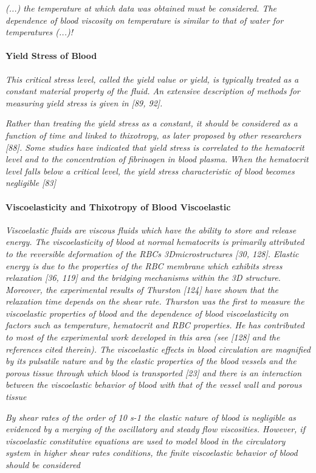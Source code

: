 \documentclass[11pt,letterpaper]{article}
\begin{document}
\textit{(...) the temperature at which
data was obtained must be considered. The dependence of blood viscosity on temperature is similar to that of water for temperatures (...)!}


\paragraph{Yield Stress of Blood}
\textit{
This critical stress level, called the yield value or
yield, is typically treated as a constant material property of the fluid. An extensive
description of methods for measuring yield stress is given in [89, 92].}

\textit{Rather than treating the yield stress as a constant, it should be considered as a function of time and linked to thixotropy, as later proposed by other researchers [88]. Some studies have indicated that yield stress is correlated to the hematocrit level and to the concentration of fibrinogen in blood plasma. When the hematocrit level falls below a critical level, the yield stress characteristic of blood becomes negligible [83]}


\paragraph{Viscoelasticity and Thixotropy of Blood
Viscoelastic}
\textit{Viscoelastic fluids are viscous fluids which have the ability to store and release energy. The viscoelasticity of blood at normal hematocrits is primarily attributed to the reversible deformation of the RBCs 3Dmicrostructures [30, 128]. Elastic energy is due to the properties of the RBC membrane which exhibits stress relaxation [36, 119] and the bridging mechanisms within the 3D structure. Moreover, the experimental results of Thurston [124] have shown that the relaxation time depends on the shear rate. Thurston was the first to measure the viscoelastic properties of blood and the dependence of blood viscoelasticity on factors such as temperature, hematocrit and RBC properties. He has contributed to most of the experimental work developed in this area (see [128] and the references cited therein). The viscoelastic effects in blood circulation are magnified by its pulsatile nature
and by the elastic properties of the blood vessels and the porous tissue through which blood is transported [23] and there is an interaction between the viscoelastic behavior of blood with that of the vessel wall and porous tissue}

\textit{By shear rates of the order of 10 s-1 the elastic nature of blood is negligible as evidenced by a merging of the oscillatory and steady flow viscosities. However, if viscoelastic constitutive equations are used to model blood in the circulatory system in higher shear rates conditions, the finite viscoelastic behavior of blood should be considered} 
\end{document}
